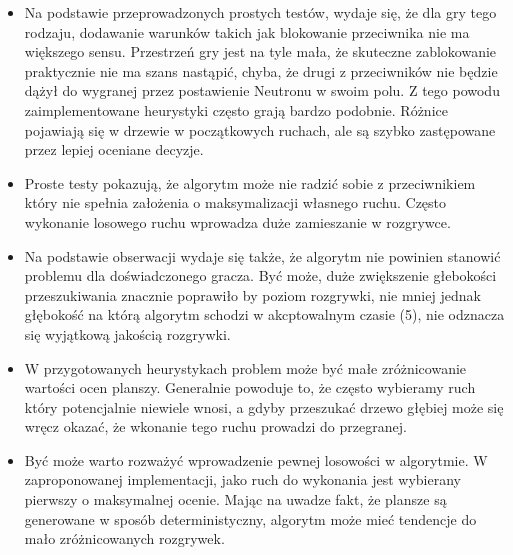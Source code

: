 \documentclass[a4paper,12pt]{article}
\begin{document}
\begin{itemize}
\item
	Na podstawie przeprowadzonych prostych testów, wydaje się, że dla gry tego rodzaju, dodawanie warunków takich jak blokowanie
	przeciwnika nie ma większego sensu. Przestrzeń gry jest na tyle mała, że skuteczne zablokowanie praktycznie nie ma szans nastąpić,
	chyba, że drugi z przeciwników nie będzie dążył do wygranej przez postawienie Neutronu w swoim polu. Z tego powodu 
	zaimplementowane heurystyki często grają bardzo podobnie. Różnice pojawiają się w drzewie w początkowych ruchach, ale są szybko
	zastępowane przez lepiej oceniane decyzje.
\item
	Proste testy pokazują, że algorytm może nie radzić sobie z przeciwnikiem który nie spełnia założenia o maksymalizacji własnego
	ruchu. Często wykonanie losowego ruchu wprowadza duże zamieszanie w rozgrywce.
\item
	Na podstawie obserwacji wydaje się także, że algorytm nie powinien stanowić problemu dla doświadczonego gracza. Być może, duże zwiększenie
	głebokości przeszukiwania znacznie poprawiło by poziom rozgrywki, nie mniej jednak głębokość na którą algorytm schodzi w akcptowalnym
	czasie (5), nie odznacza się wyjątkową jakością rozgrywki.
\item
	W przygotowanych heurystykach problem może być małe zróżnicowanie wartości ocen planszy. Generalnie powoduje to, że często wybieramy
	ruch który potencjalnie niewiele wnosi, a gdyby przeszukać drzewo głębiej może się wręcz okazać, że wkonanie tego ruchu prowadzi do
	przegranej.
\item
	Być może warto rozważyć wprowadzenie pewnej losowości w algorytmie. W zaproponowanej implementacji, jako ruch do wykonania jest wybierany
	pierwszy o maksymalnej ocenie. Mając na uwadze fakt, że plansze są generowane w sposób deterministyczny, algorytm może mieć tendencje do 
	mało zróżnicowanych rozgrywek.
	
\end{itemize}
\end{document}
